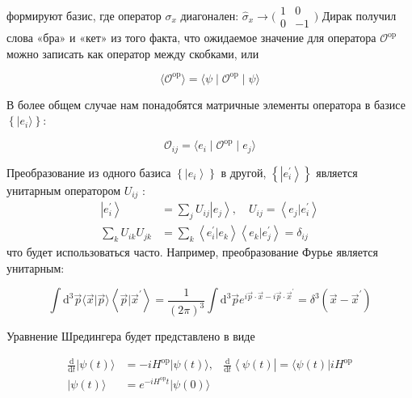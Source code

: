 \documentclass[main.tex]{subfiles}
\begin{document}
формируют базис, где оператор $\sigma_x$ диагонален: $\hat\sigma_x\rightarrow\bigl(\begin{smallmatrix}
 1& 0\\ 
 0&-1 
\end{smallmatrix}\bigr)$             
Дирак получил слова «бра» и «кет» из того факта, что ожидаемое значение для оператора $\mathcal{O}^{\mathrm{op}}$ можно записать как оператор между скобками, или

\begin{equation}\label{11.9}
\langle\mathcal{O}^{\mathrm{op}}\rangle = \langle\psi\mid\mathcal{O}^{\mathrm{op}}\mid\psi\rangle
\end{equation}

         
В более общем случае нам понадобятся матричные элементы оператора в базисе $\left\{\mid e_i\rangle\right\}$:

\begin{equation}\label{11.10}
\mathcal{O}_{ij} = \langle e_i\mid\mathcal{O}^{\mathrm{op}}\mid e_j\rangle
\end{equation}


Преобразование из одного базиса $\left\{\left|e_{i}\right\rangle\right\}$ в другой, $\left\{\left|e_{i}^{\prime}\right\rangle\right\}$ является унитарным оператором $U_{i j}$ :
$$
\begin{aligned}\label{11.11}
\left|e_{i}^{\prime}\right\rangle &=\sum_{j} U_{i j}\left|e_{j}\right\rangle, \quad U_{i j}=\left\langle e_{j} | e_{i}^{\prime}\right\rangle \\
\sum_{k} U_{i k} U_{j k} &=\sum_{k}\left\langle e_{i}^{\prime} | e_{k}\right\rangle\left\langle e_{k} | e_{j}^{\prime}\right\rangle=\delta_{i j}
\end{aligned}
$$
что будет использоваться часто. Например, преобразование Фурье является унитарным:

\begin{equation}\label{}
\int \mathrm{d}^{3} \vec{p}\langle\vec{x} | \vec{p}\rangle\left\langle\vec{p} | \vec{x}^{\prime}\right\rangle=\frac{1}{(2 \pi)^{3}} \int \mathrm{d}^{3} \vec{p} e^{i \vec{p} \cdot \vec{x}-i \vec{p} \cdot \vec{x}^{\prime}}=\delta^{3}\left(\vec{x}-\vec{x}^{\prime}\right)
\end{equation}

Уравнение Шредингера будет представлено в виде

\begin{equation}\label{11.13}
\begin{aligned}
\frac{\mathrm{d}}{\mathrm{d} t}|\psi(t)\rangle &=-i H^{\mathrm{op}}|\psi(t)\rangle, & \frac{\mathrm{d}}{\mathrm{d} t}\left\langle\psi(t)\left|=\langle\psi(t)| i H^{\mathrm{op}}\right.\right.\\
|\psi(t)\rangle &=e^{-i H^{\mathrm{op}} t}|\psi(0)\rangle
\end{aligned}
\end{equation}
\end{document}
